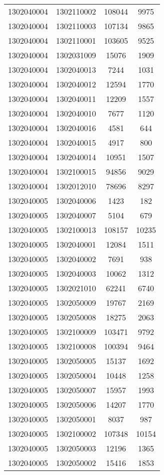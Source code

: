 \begin{longtable}[h]{llcc}
		1302040004 & 1302110002 & 108044 & 9975\\
		1302040004 & 1302110003 & 107134 & 9865\\
		1302040004 & 1302110001 & 103605 & 9525\\
		1302040004 & 1302031009 & 15076 & 1909\\
		1302040004 & 1302040013 & 7244 & 1031\\
		1302040004 & 1302040012 & 12594 & 1770\\
		1302040004 & 1302040011 & 12209 & 1557\\
		1302040004 & 1302040010 & 7677 & 1120\\
		1302040004 & 1302040016 & 4581 & 644\\
		1302040004 & 1302040015 & 4917 & 800\\
		1302040004 & 1302040014 & 10951 & 1507\\
		1302040004 & 1302100015 & 94856 & 9029\\
		1302040004 & 1302012010 & 78696 & 8297\\
		1302040005 & 1302040006 & 1423 & 182\\
		1302040005 & 1302040007 & 5104 & 679\\
		1302040005 & 1302100013 & 108157 & 10235\\
		1302040005 & 1302040001 & 12084 & 1511\\
		1302040005 & 1302040002 & 7691 & 938\\
		1302040005 & 1302040003 & 10062 & 1312\\
		1302040005 & 1302021010 & 62241 & 6740\\
		1302040005 & 1302050009 & 19767 & 2169\\
		1302040005 & 1302050008 & 18275 & 2063\\
		1302040005 & 1302100009 & 103471 & 9792\\
		1302040005 & 1302100008 & 100394 & 9464\\
		1302040005 & 1302050005 & 15137 & 1692\\
		1302040005 & 1302050004 & 10448 & 1258\\
		1302040005 & 1302050007 & 15957 & 1993\\
		1302040005 & 1302050006 & 14207 & 1770\\
		1302040005 & 1302050001 & 8037 & 987\\
		1302040005 & 1302100002 & 107348 & 10154\\
		1302040005 & 1302050003 & 12196 & 1365\\
		1302040005 & 1302050002 & 15416 & 1853\\

\end{longtable}
